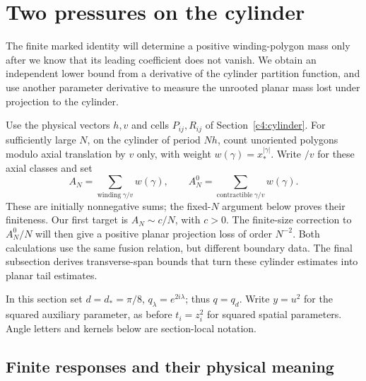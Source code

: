 \section{Two pressures on the cylinder}\label{c4:pressure}

The finite marked identity will determine a positive winding-polygon mass
only after we know that its leading coefficient does not vanish. We obtain
an independent lower bound from a derivative of the cylinder partition
function, and use another parameter derivative to measure the unrooted planar mass
lost under projection to the cylinder.

Use the physical vectors \(h,v\) and cells \(P_{ij},R_{ij}\) of
Section~\ref{c4:cylinder}. For sufficiently large \(N\), on the cylinder
of period \(Nh\), count
unoriented polygons modulo axial translation by \(v\) only, with weight
\(w(\gamma)=x_*^{|\gamma|}\). Write \(/v\) for these axial classes and set
\[
 A_N=\sum_{\mathrm{winding}\ \gamma/v}w(\gamma),\qquad
 A_N^0=\sum_{\mathrm{contractible}\ \gamma/v}w(\gamma).
\]
These are initially nonnegative sums; the fixed-\(N\) argument below
proves their finiteness. Our first target is \(A_N\sim c/N\), with
\(c>0\). The finite-size correction to \(A_N^0/N\) will then give a
positive planar projection loss of order \(N^{-2}\). Both calculations
use the same fusion relation, but different boundary data. The final
subsection derives transverse-span bounds that turn these cylinder
estimates into planar tail estimates.

In this section set \(d=d_*=\pi/8\), \(q_\lambda=e^{2i\lambda}\); thus
\(q=q_d\). Write \(y=u^2\) for the squared auxiliary parameter, as before
\(t_i=z_i^2\) for squared spatial parameters. Angle letters and kernels
below are section-local notation.

\subsection{Finite responses and their physical meaning}

